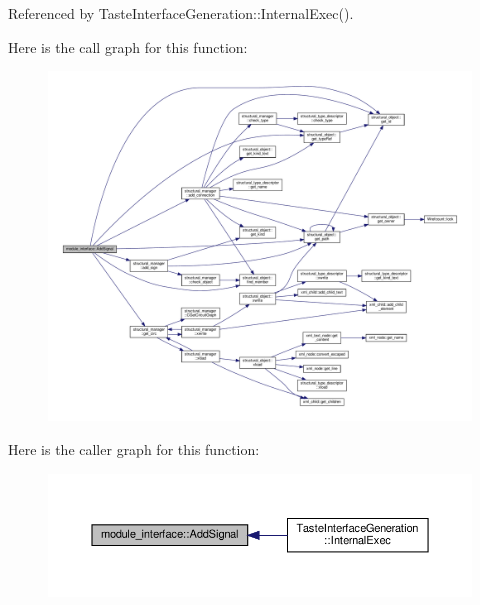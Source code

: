 Referenced by Taste\+Interface\+Generation\+::\+Internal\+Exec().

Here is the call graph for this function\+:
\nopagebreak
\begin{figure}[H]
\begin{center}
\leavevmode
\includegraphics[width=350pt]{d9/d0e/classmodule__interface_a5530441acd63973aa14d4bcc27ce5a70_cgraph}
\end{center}
\end{figure}
Here is the caller graph for this function\+:
\nopagebreak
\begin{figure}[H]
\begin{center}
\leavevmode
\includegraphics[width=350pt]{d9/d0e/classmodule__interface_a5530441acd63973aa14d4bcc27ce5a70_icgraph}
\end{center}
\end{figure}
\mbox{\label{classmodule__interface_a48a74ac615057c46e4bc09b05b644e73}} 
